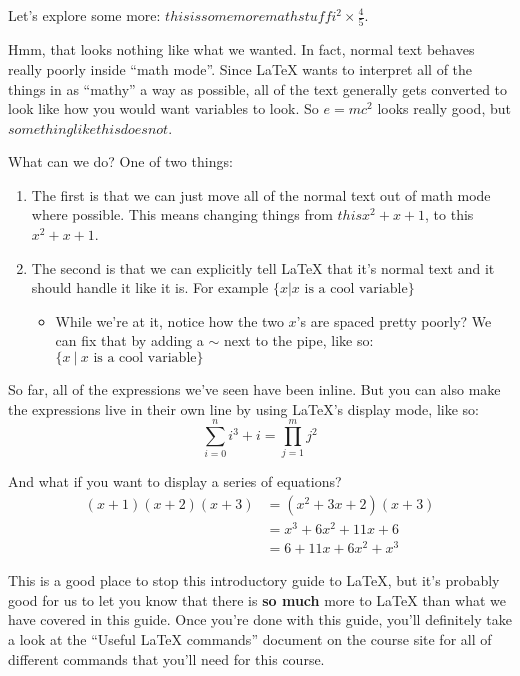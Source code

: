 \documentclass{article}
\begin{document}
Let's explore some more: $this is some more math stuff i^2 \times \frac{4}{5}$.

Hmm, that looks nothing like what we wanted. In fact, normal text behaves really
poorly inside ``math mode''. Since LaTeX wants to interpret all of the things
in as ``mathy'' a way as possible, all of the text generally gets converted to
look like how you would want variables to look. So $e=mc^2$ looks really good, but
$something like this does not$.

What can we do? One of two things:
\begin{enumerate}
  \item The first is that we can just move all of the normal text out of math
  mode where possible. This means changing things from $this x^2+x+1$, to this
  $x^2+x+1$.
  \item The second is that we can explicitly tell \LaTeX{} \@ that it's normal text
  and it should handle it like it is. For example
  $\{x | x \text{ is a cool variable} \}$
  \begin{itemize}
    \item While we're at it, notice how the two $x$'s are spaced pretty poorly?
    We can fix that by adding a $\sim$ next to the pipe, like so:
    $\{x ~|~ x \text{ is a cool variable} \}$
  \end{itemize}
\end{enumerate}

So far, all of the expressions we've seen have been inline. But you can also
make the expressions live in their own line by using \LaTeX's display mode,
like so:
\[\sum_{i=0}^n i^3 + i = \prod_{j=1}^m j^2\]

And what if you want to display a series of equations?
\begin{align*}
  (x+1)(x+2)(x+3) &= (x^2+3x+2)(x+3)\\
  &= x^3+6x^2+11x+6\\
  &= 6 + 11x + 6x^2 + x^3
\end{align*}

This is a good place to stop this introductory guide to \LaTeX, but it's probably
good for us to let you know that there is \textbf{so much} more to \LaTeX{} \@ than
what we have covered in this guide. Once you're done with this guide, you'll
definitely take a look at the ``Useful \LaTeX{} \@ commands'' document on the course
site for all of different commands that you'll need for this course.
\end{document}
